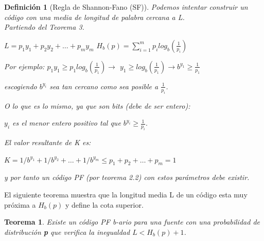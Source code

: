 \documentclass{beamer}
\newtheorem{teorema} [Teorema] {Teorema}
\newtheorem{definicion} [Definicion]{Definición}
\begin{document}
\begin{frame}  \small

\begin{definicion}[Regla de Shannon-Fano (SF)]

Podemos intentar construir un código con una media de longitud de palabra cercana a L.
\vspace{0.25cm}\\
Partiendo del Teorema 3. 

\begin{center}
$L=p_1y_1+p_2y_2+ \ldots +p_my_m$ \hspace{0.25cm} \geq \hspace{0.25cm}
$H_b(p) =  \sum^{m}_{i=1} p_i log_b(\frac{1}{p_i})  $

\end{center}

\begin{center}Por ejemplo: 
$ p_1 y_1 \geq p_1 log_b(\frac{1}{p_1})  \rightarrow  $ 
$  y_1 \geq log_b(\frac{1}{p_1})  \rightarrow  b^{y_1} \geq \frac{1}{p_1}  $
\end{center}

escogiendo $b^{y_{i}}$ sea tan cercano como sea posible a $\frac{1}{p_i}$.

O lo que es lo mismo, ya que son bits (debe de ser entero):

\begin{center}
$y_i$ es el menor entero positivo tal que $b^{y_{i}}  \geq \frac{1}{p_i}.$
\end{center}

El valor resultante de K es:

\begin{center}
$ K= 1/b^{y_{1}}+1/b^{y_{2}}+\ldots+1/b^{y_{m}} \leq p_1+p_2+\ldots+p_m=1$
\end{center}

y por tanto un código PF (por teorema 2.2) con estos parámetros debe existir.

\end{definicion}


\end{frame} 


\begin{frame}  \small

El siguiente teorema muestra que la longitud media L de un código esta muy próxima a $H_b(p)$ y define la cota superior.

\vspace{1cm}
\begin{teorema}\label{theorem:limitemenor}
Existe un código PF b-ario para una fuente con una probabilidad de distribución \textbf{p} que verifica la inegualdad  $L < H_b(p) + 1$.	
\end{teorema}

\end{frame} 
\end{document}
